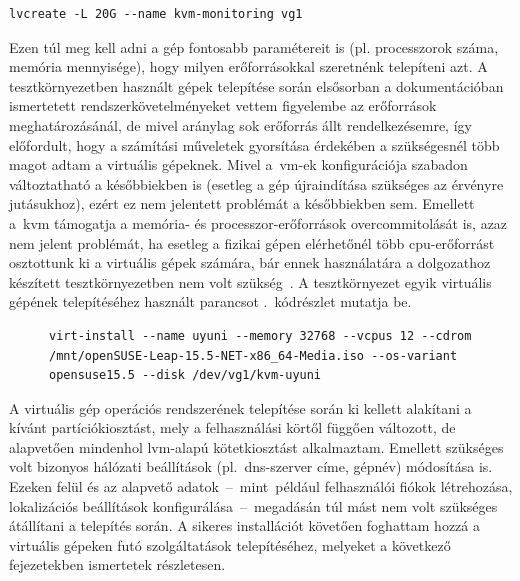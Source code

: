 \vspace{2mm}
\begin{lstlisting}[caption=Virtuális gépek logikai kötetének létrehozásához használt parancs.,label=lst:lvcreate]
	lvcreate -L 20G --name kvm-monitoring vg1
\end{lstlisting}

Ezen túl meg kell adni a gép fontosabb paramétereit is (pl. processzorok száma, memória mennyisége), hogy milyen erőforrásokkal szeretnénk telepíteni azt. A tesztkörnyezetben használt gépek telepítése során elsősorban a dokumentációban ismertetett rendszerkövetelményeket vettem figyelembe az erőforrások meghatározásánál, de mivel aránylag sok erőforrás állt rendelkezésemre, így előfordult, hogy a számítási műveletek gyorsítása érdekében a szükségesnél több magot adtam a virtuális gépeknek. Mivel a~\acrshort{vm}-ek konfigurációja szabadon változtatható a későbbiekben is (esetleg a gép újraindítása szükséges az érvényre jutásukhoz), ezért ez nem jelentett problémát a későbbiekben sem. Emellett a~\acrshort{kvm} támogatja a memória- és processzor-erőforrások \gls{overcommit}olását is, azaz nem jelent problémát, ha esetleg a fizikai gépen elérhetőnél több \acrshort{cpu}-erőforrást osztottunk ki a virtuális gépek számára, bár ennek használatára a dolgozathoz készített tesztkörnyezetben nem volt szükség~\cite{RedHatKvmOvercommit}.
A tesztkörnyezet egyik virtuális gépének telepítéséhez használt parancsot .~kódrészlet mutatja be.

\vspace{2mm}
\begin{figure}[htb]
\begin{lstlisting}[caption=Virtuális gép telepítése a \texttt{virt-install} segédprogrammal.,label=lst:virtinstall]
	virt-install --name uyuni --memory 32768 --vcpus 12 --cdrom /mnt/openSUSE-Leap-15.5-NET-x86_64-Media.iso --os-variant opensuse15.5 --disk /dev/vg1/kvm-uyuni\end{lstlisting}
\end{figure}

A virtuális gép operációs rendszerének telepítése során ki kellett alakítani a kívánt partíciókiosztást, mely a felhasználási körtől függően változott, de alapvetően mindenhol \acrshort{lvm}-alapú kötetkiosztást alkalmaztam. Emellett szükséges volt bizonyos hálózati beállítások (pl.~\acrshort{dns}-szerver címe, gépnév) módosítása is. Ezeken felül és az alapvető adatok~--~mint~például felhasználói fiókok létrehozása, lokalizációs beállítások konfigurálása~--~megadásán túl mást nem volt szükséges átállítani a telepítés során. A sikeres installációt követően foghattam hozzá a virtuális gépeken futó szolgáltatások telepítéséhez, melyeket a következő fejezetekben ismertetek részletesen.
